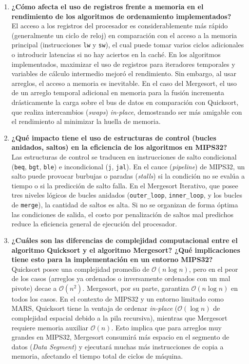 \documentclass[12pt,letterpaper]{article}
\begin{document}
\begin{enumerate}[label=\textbf{\arabic*.}, leftmargin=*]
    \item \textbf{¿Cómo afecta el uso de registros frente a memoria en el rendimiento de los algoritmos de ordenamiento implementados?} \\
    El acceso a los registros del procesador es considerablemente más rápido (generalmente un ciclo de reloj) en comparación con el acceso a la memoria principal (instrucciones \texttt{lw} y \texttt{sw}), el cual puede tomar varios ciclos adicionales o introducir latencias si no hay aciertos en la caché. En los algoritmos implementados, maximizar el uso de registros para iteradores temporales y variables de cálculo intermedio mejoró el rendimiento. Sin embargo, al usar arreglos, el acceso a memoria es inevitable. En el caso del Mergesort, el uso de un arreglo temporal adicional en memoria para la fusión incrementa drásticamente la carga sobre el bus de datos en comparación con Quicksort, que realiza intercambios (\textit{swaps}) \textit{in-place}, demostrando ser más amigable con el rendimiento al minimizar la huella de memoria.

    \item \textbf{¿Qué impacto tiene el uso de estructuras de control (bucles anidados, saltos) en la eficiencia de los algoritmos en MIPS32?} \\
    Las estructuras de control se traducen en instrucciones de salto condicional (\texttt{beq}, \texttt{bgt}, \texttt{ble}) e incondicional (\texttt{j}, \texttt{jal}). En el cauce (\textit{pipeline}) de MIPS32, un salto puede provocar burbujas o paradas (\textit{stalls}) si la condición no se evalúa a tiempo o si la predicción de salto falla. En el Mergesort Iterativo, que posee tres niveles lógicos de bucles anidados (\texttt{outer\_loop}, \texttt{inner\_loop}, y los bucles de \texttt{merge}), la cantidad de saltos es alta. Si no se organizan de forma óptima las condiciones de salida, el costo por penalización de saltos mal predichos reduce la eficiencia general de ejecución del procesador.

    \item \textbf{¿Cuáles son las diferencias de complejidad computacional entre el algoritmo Quicksort y el algoritmo Mergesort? ¿Qué implicaciones tiene esto para la implementación en un entorno MIPS32?} \\
    Quicksort posee una complejidad promedio de $\mathcal{O}(n \log n)$, pero en el peor de los casos (arreglos ya ordenados o inversamente ordenados con un mal pivote) decae a $\mathcal{O}(n^2)$. Mergesort, por su parte, garantiza $\mathcal{O}(n \log n)$ en todos los casos. En el contexto de MIPS32 y un entorno limitado como MARS, Quicksort tiene la ventaja de ordenar \textit{in-place} ($\mathcal{O}(\log n)$ de complejidad espacial debido a la pila recursiva), mientras que Mergesort requiere memoria auxiliar $\mathcal{O}(n)$. Esto implica que para arreglos muy grandes en MIPS32, Mergesort consumirá más espacio en el segmento de datos (\textit{Data Segment}) y ejecutará muchas más instrucciones de copia a memoria, afectando el tiempo total de ciclos de máquina.


\end{enumerate}
\end{document}
